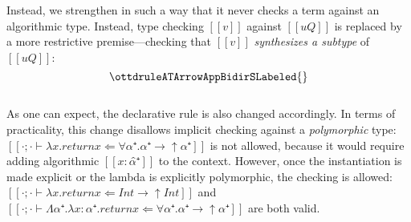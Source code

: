     Instead, we strengthen
    in such a way that it never checks a term against an algorithmic type.
    Instead, type checking $[[v]]$ against $[[uQ]]$ is replaced by 
    a more restrictive premise---checking that $[[v]]$ \emph{synthesizes a subtype} of $[[uQ]]$:
    $$ \ottdruleATArrowAppBidirSLabeled{} $$\\

    As one can expect, the declarative rule is also changed accordingly.
    In terms of practicality, this change disallows
    implicit checking against a \emph{polymorphic} type:
    $[[·;· ⊢ λx.return x ⇐ ∀α⁺.α⁺ → ↑α⁺]]$ is not allowed, because
    it would require adding algorithmic $[[x:α̂⁺]]$ to the context.
    However, once the instantiation is made explicit or the lambda is explicitly 
    polymorphic, the checking is allowed:
     $[[·;· ⊢ λx.return x ⇐ Int → ↑Int]]$ and 
     $[[·;· ⊢ Λα⁺.λx:α⁺.return x ⇐ ∀α⁺.α⁺ → ↑α⁺]]$ are both valid.
